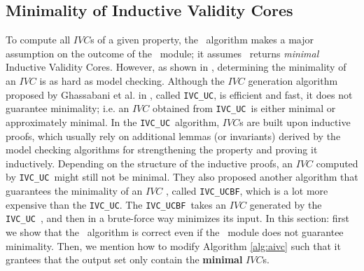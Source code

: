 \subsection{Minimality of Inductive Validity Cores}
\label{subsec:minimality}
\newcommand{\ucalg}{\texttt{\small{IVC\_UC}}}
\newcommand{\ucbfalg}{\texttt{\small{IVC\_UCBF}}}

To compute all $IVC$s of a given property, the \aivcalg ~algorithm
 makes a major assumption on the outcome of the \getivc ~module;
it assumes \getivc ~returns \emph{minimal} Inductive Validity Cores. 
However, as shown in \cite{Ghass16}, 
determining  the minimality of  an  $IVC$ is  as  hard  as
model checking. Although the $IVC$ generation algorithm proposed by Ghassabani et al. 
 in \cite{Ghass16}, called \ucalg ,
is efficient and fast, it does not guarantee minimality;
i.e. an $IVC$ obtained from \ucalg ~is either minimal or approximately minimal. 
In the \ucalg ~algorithm, $IVC$s are built upon inductive proofs, 
which usually rely on additional
lemmas (or invariants) derived by the model checking algorithms 
for strengthening the property and proving it
inductively. 
Depending on the structure of the inductive
proofs, an $IVC$ computed by \ucalg ~might still not be minimal. 
They also proposed another algorithm that guarantees 
the minimality of an $IVC$ \cite{Ghass16}, called \ucbfalg, which is a lot more expensive than the \ucalg. The \ucbfalg ~takes an $IVC$ generated by 
the \ucalg ~, and then in a brute-force way minimizes its input. In this section:
first we show that the \aivcalg ~algorithm is correct even if
 the \getivc ~module does not guarantee minimality.
Then, we mention how to modify Algorithm \ref{alg:aivc}
 such that it grantees that the output set only contain the \textbf{minimal} $IVC$s. 


